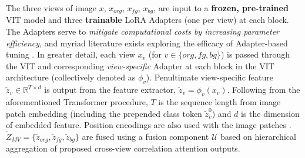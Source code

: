 The three views of image $x$, $x_{org}$, $x_{fg}$, $x_{bg}$, are input to a \textbf{frozen, pre-trained} VIT model and three \textbf{trainable} LoRA Adapters \cite{hu2021lora} (one per view) at each block. The Adapters serve to \textit{mitigate computational costs by increasing parameter efficiency}, and myriad literature exists exploring the efficacy of Adapter-based tuning \cite{hanparameter}. In greater detail, each view $x_v$ (for $v \in \{org, fg, bg\}$) is passed through the VIT and corresponding \textit{view-specific} Adapter at each block in the VIT architecture (collectively denoted as $\phi_v$). Penultimate view-specific feature $\tilde{z}_v \in \mathbb{R}^{T \times d}$ is output from the feature extractor, $\tilde{z}_v = \phi_v (x_v)$. Following from the aforementioned Transformer procedure, $T$ is the sequence length from image patch embedding (including the prepended class token $\tilde{z}_{v}^{0}$) and $d$ is the dimension of embedded feature. Position encodings are also used with the image patches \cite{dosovitskiy2020image}. $\tilde{Z}_{MV} = \{\tilde{z}_{org}, \tilde{z}_{fg}, \tilde{z}_{bg}\}$ are fused using a fusion component $\mathcal{U}$ based on hierarchical aggregation of proposed cross-view correlation attention outputs.

